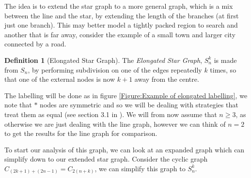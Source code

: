 \documentclass[a4paper,10pt]{article}
\theoremstyle{definition}
\newtheorem{definition}[theorem]{Definition}
\theoremstyle{definition}
\theoremstyle{remark}
\theoremstyle{definition}
\begin{document}
The idea is to extend the star graph to a more general graph, which is a mix between the line and the star, by extending the length of the branches (at first just one branch). This may better model a tightly packed region to search and another that is far away, consider the example of a small town and larger city connected by a road. 

\begin{definition}[Elongated Star Graph]
The \textit{Elongated Star Graph}, $S_{n}^{k}$ is made from $S_{n}$, by performing subdivision on one of the edges repeatedly $k$ times, so that one of the external nodes is now $k+1$ away from the centre.
\end{definition}

The labelling will be done as in figure \ref{Figure:Example of elongated labelling}, we note that $*$ nodes are symmetric and so we will be dealing with strategies that treat them as equal (see section 3.1 in \cite{Lin2013}). We will from now assume that $n \geq 3$, as otherwise we are just dealing with the line graph, however we can think of $n=2$ to get the results for the line graph for comparison.


\begin{myfigure}
\begin{center}
\end{center}
\caption{Labeling on the graph $S_{4}^5$.}
\label{Figure:Example of elongated labelling}
\end{myfigure}

To start our analysis of this graph, we can look at an expanded graph which can simplify down to our extended star graph. Consider the cyclic graph $C_{(2k+1)+(2n-1)}=C_{2(n+k)}$, we can simplify this graph to $S_{n}^{k}$.
\end{document}
